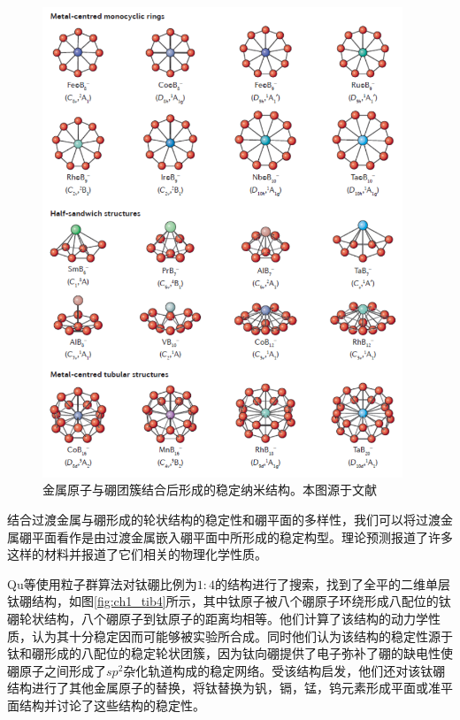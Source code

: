 \begin{figure}[bt]
  \includegraphics[width=0.96\textwidth]{figs/ch1_boron_metal_cluster.png}
  \centering
  \caption{金属原子与硼团簇结合后形成的稳定纳米结构。本图源于文献\cite{li2017planar}}
  \label{fig:ch1_boron_metal_cluster}
\end{figure}

结合过渡金属与硼形成的轮状结构的稳定性和硼平面的多样性，我们可以将过渡金属硼平面看作是由过渡金属嵌入硼平面中所形成的稳定构型。理论预测报道了许多这样的材料并报道了它们相关的物理化学性质。

Qu等\cite{qu2017two}使用粒子群算法对钛硼比例为$1:4$的结构进行了搜索，找到了全平的二维单层钛硼结构，如图\ref{fig:ch1_tib4}所示，其中钛原子被八个硼原子环绕形成八配位的钛硼轮状结构，八个硼原子到钛原子的距离均相等。他们计算了该结构的动力学性质，认为其十分稳定因而可能够被实验所合成。同时他们认为该结构的稳定性源于钛和硼形成的八配位的稳定轮状团簇，因为钛向硼提供了电子弥补了硼的缺电性使硼原子之间形成了$sp^2$杂化轨道构成的稳定网络。受该结构启发，他们还对该钛硼结构进行了其他金属原子的替换，将钛替换为钒，镉，锰，钨元素形成平面或准平面结构并讨论了这些结构的稳定性。

